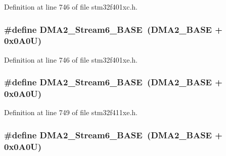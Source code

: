 Definition at line 746 of file stm32f401xc.\+h.

\subsubsection[{\texorpdfstring{D\+M\+A2\+\_\+\+Stream6\+\_\+\+B\+A\+SE}{DMA2_Stream6_BASE}}]{\setlength{\rightskip}{0pt plus 5cm}\#define D\+M\+A2\+\_\+\+Stream6\+\_\+\+B\+A\+SE~({\bf D\+M\+A2\+\_\+\+B\+A\+SE} + 0x0\+A0\+U)}\hypertarget{group___peripheral__registers__structures_ga5e81174c96fd204fa7c82c815e85c8e6}{}\label{group___peripheral__registers__structures_ga5e81174c96fd204fa7c82c815e85c8e6}


Definition at line 746 of file stm32f401xe.\+h.

\subsubsection[{\texorpdfstring{D\+M\+A2\+\_\+\+Stream6\+\_\+\+B\+A\+SE}{DMA2_Stream6_BASE}}]{\setlength{\rightskip}{0pt plus 5cm}\#define D\+M\+A2\+\_\+\+Stream6\+\_\+\+B\+A\+SE~({\bf D\+M\+A2\+\_\+\+B\+A\+SE} + 0x0\+A0\+U)}\hypertarget{group___peripheral__registers__structures_ga5e81174c96fd204fa7c82c815e85c8e6}{}\label{group___peripheral__registers__structures_ga5e81174c96fd204fa7c82c815e85c8e6}


Definition at line 749 of file stm32f411xe.\+h.

\subsubsection[{\texorpdfstring{D\+M\+A2\+\_\+\+Stream6\+\_\+\+B\+A\+SE}{DMA2_Stream6_BASE}}]{\setlength{\rightskip}{0pt plus 5cm}\#define D\+M\+A2\+\_\+\+Stream6\+\_\+\+B\+A\+SE~({\bf D\+M\+A2\+\_\+\+B\+A\+SE} + 0x0\+A0\+U)}\hypertarget{group___peripheral__registers__structures_ga5e81174c96fd204fa7c82c815e85c8e6}{}\label{group___peripheral__registers__structures_ga5e81174c96fd204fa7c82c815e85c8e6}



